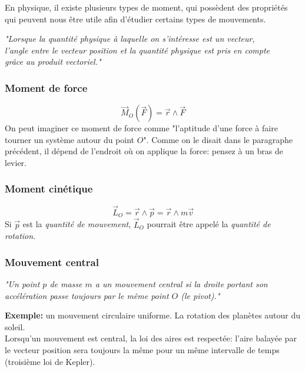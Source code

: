 \documentclass{article}
\numberwithin{equation}{section}
\begin{document}
En physique, il existe plusieurs types de moment, qui possèdent des propriétés qui peuvent nous être utile afin d'étudier certains types de mouvements. \\

\begin{center}
	\emph{"Lorsque la quantité physique à laquelle on s'intéresse est un vecteur, \\ l'angle entre le vecteur position et la quantité physique est pris en compte \\ grâce au produit vectoriel."}
\end{center}

\subsubsection{Moment de force}
\begin{equation}
	\boxed{ \vec M_O ( \vec F ) = \vec r \wedge \vec F }
\end{equation}
On peut imaginer ce moment de force comme "l'aptitude d'une force à faire tourner un système autour du point \(O\)". Comme on le disait dans le paragraphe précédent, il dépend de l'endroit où on applique la force: pensez à un bras de levier.

\subsubsection{Moment cinétique}
\begin{equation}
	\boxed{ \vec L_O = \vec r \wedge \vec p = \vec r \wedge m \vec v }
\end{equation}
Si \(\vec p\) est la \emph{quantité de mouvement}, \(\vec L_O\) pourrait être appelé la \emph{quantité de rotation}.

\subsubsection{Mouvement central}
\begin{center}
	\emph{"Un point \(p\) de masse \(m\) a un mouvement central si la droite portant son accélération passe toujours par le même point \(O\) (le pivot)."}
\end{center}
\textbf{Exemple:} un mouvement circulaire uniforme. La rotation des planètes autour du soleil.\\
Lorsqu'un mouvement est central, la loi des aires est respectée: l'aire balayée par le vecteur position sera toujours la même pour un même intervalle de temps (troisième loi de Kepler). \\
\end{document}
